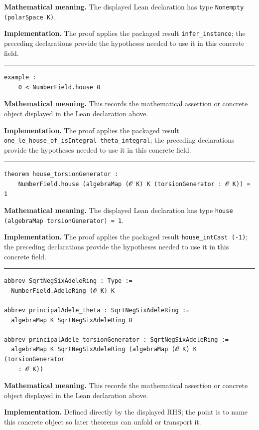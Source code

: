 \documentclass[UTF8,a4paper,11pt,fontset=fandol]{ctexart}
\theoremstyle{definition}
\newcommand{\statementsep}{\par\medskip\hrule\medskip}
\begin{document}
\noindent\textbf{Mathematical meaning.} The displayed Lean declaration has type \texttt{Nonempty (polarSpace K)}.\par
\noindent\textbf{Implementation.} The proof applies the packaged result \texttt{infer\_\allowbreak{}instance}; the preceding declarations provide the hypotheses needed to use it in this concrete field.\par
\statementsep
\begin{verbatim}
example :
    0 < NumberField.house θ
\end{verbatim}
\noindent\textbf{Mathematical meaning.} This records the mathematical assertion or concrete object displayed in the Lean declaration above.\par
\noindent\textbf{Implementation.} The proof applies the packaged result \texttt{one\_\allowbreak{}le\_\allowbreak{}house\_\allowbreak{}of\_\allowbreak{}isIntegral theta\_\allowbreak{}integral}; the preceding declarations provide the hypotheses needed to use it in this concrete field.\par
\statementsep
\begin{verbatim}
theorem house_torsionGenerator :
    NumberField.house (algebraMap (𝓞 K) K (torsionGenerator : 𝓞 K)) = 1
\end{verbatim}
\noindent\textbf{Mathematical meaning.} The displayed Lean declaration has type \texttt{house (algebraMap torsionGenerator) = 1}.\par
\noindent\textbf{Implementation.} The proof applies the packaged result \texttt{house\_\allowbreak{}intCast (-1)}; the preceding declarations provide the hypotheses needed to use it in this concrete field.\par
\statementsep
\begin{verbatim}
abbrev SqrtNegSixAdeleRing : Type :=
  NumberField.AdeleRing (𝓞 K) K

abbrev principalAdele_theta : SqrtNegSixAdeleRing :=
  algebraMap K SqrtNegSixAdeleRing θ

abbrev principalAdele_torsionGenerator : SqrtNegSixAdeleRing :=
  algebraMap K SqrtNegSixAdeleRing (algebraMap (𝓞 K) K (torsionGenerator
    : 𝓞 K))
\end{verbatim}
\noindent\textbf{Mathematical meaning.} This records the mathematical assertion or concrete object displayed in the Lean declaration above.\par
\noindent\textbf{Implementation.} Defined directly by the displayed RHS; the point is to name this concrete object so later theorems can unfold or transport it.\par
\end{document}
